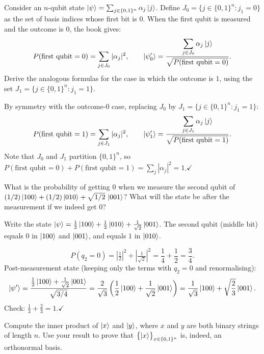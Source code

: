 \documentclass{ceri/sty/rapport}
\newcounter{exercice}[section]
\begin{document}
\begin{exercice}[p.~38]
Consider an $n$-qubit state $\ket{\psi}=\sum_{j\in\{0,1\}^n}\alpha_j\ket{j}$.
Define $J_0=\{j\in\{0,1\}^n : j_1=0\}$ as the set of basis indices whose first bit is $0$.
When the first qubit is measured and the outcome is $0$, the book gives:
\[
  P(\text{first qubit}=0)=\sum_{j\in J_0}|\alpha_j|^2,
  \qquad
  \ket{\psi'_0}=\frac{\displaystyle\sum_{j\in J_0}\alpha_j\ket{j}}
                     {\sqrt{P(\text{first qubit}=0)}}.
\]
Derive the analogous formulas for the case in which the outcome is $1$,
using the set $J_1=\{j\in\{0,1\}^n : j_1=1\}$.
\end{exercice}

\begin{solution}
By symmetry with the outcome-$0$ case, replacing $J_0$ by $J_1=\{j\in\{0,1\}^n:j_1=1\}$:
\[
  P(\text{first qubit}=1)=\sum_{j\in J_1}|\alpha_j|^2,
  \qquad
  \ket{\psi'_1}=\frac{\displaystyle\sum_{j\in J_1}\alpha_j\ket{j}}
                     {\sqrt{P(\text{first qubit}=1)}}.
\]
Note that $J_0$ and $J_1$ partition $\{0,1\}^n$, so
$P(\text{first qubit}=0)+P(\text{first qubit}=1)=\sum_{j}|\alpha_j|^2=1$.\quad$\checkmark$
\end{solution}

\begin{exercice}[p.~38]
What is the probability of getting $0$ when we measure the second qubit of
$(1/2)\ket{100} + (1/2)\ket{010} + \sqrt{1/2}\,\ket{001}$?
What will the state be after the measurement if we indeed get $0$?
\end{exercice}

\begin{solution}
Write the state $\ket{\psi}=\tfrac{1}{2}\ket{100}+\tfrac{1}{2}\ket{010}+\tfrac{1}{\sqrt{2}}\ket{001}$.
The second qubit (middle bit) equals $0$ in $\ket{100}$ and $\ket{001}$, and equals $1$ in $\ket{010}$.

\[
  P(q_2=0) = \left|\tfrac{1}{2}\right|^2+\left|\tfrac{1}{\sqrt{2}}\right|^2
           = \frac{1}{4}+\frac{1}{2} = \frac{3}{4}.
\]
Post-measurement state (keeping only the terms with $q_2=0$ and renormalising):
\[
  \ket{\psi'} = \frac{\frac{1}{2}\ket{100}+\frac{1}{\sqrt{2}}\ket{001}}{\sqrt{3/4}}
              = \frac{2}{\sqrt{3}}\left(\frac{1}{2}\ket{100}+\frac{1}{\sqrt{2}}\ket{001}\right)
              = \frac{1}{\sqrt{3}}\ket{100}+\sqrt{\frac{2}{3}}\ket{001}.
\]
Check: $\tfrac{1}{3}+\tfrac{2}{3}=1$.\quad$\checkmark$
\end{solution}

\begin{exercice}[p.~39]
Compute the inner product of $\ket{x}$ and $\ket{y}$, where $x$ and $y$ are
both binary strings of length $n$. Use your result to prove that
$\bigl\{\ket{x}\bigr\}_{x\in\{0,1\}^n}$ is, indeed, an orthonormal basis.
\end{exercice}
\end{document}
